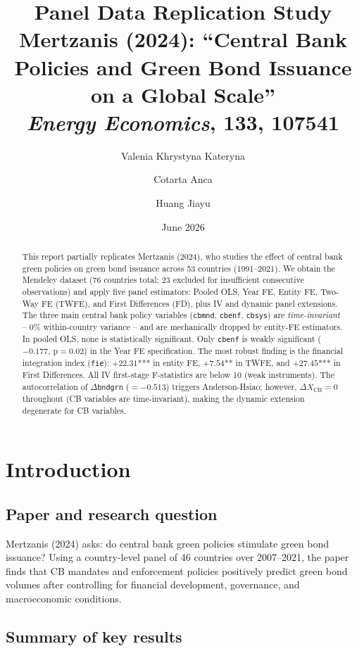 \documentclass[12pt,a4paper]{article}
\title{\textbf{Panel Data Replication Study}\\[0.5em]
\large Mertzanis (2024): ``Central Bank Policies and Green Bond Issuance on a Global Scale''\\
\normalsize \textit{Energy Economics}, 133, 107541}
\author{Valenia Khrystyna Kateryna \and Cotarta Anca \and Huang Jiayu}
\date{June 2026}
\begin{document}
\maketitle
\tableofcontents
\newpage

\begin{abstract}
This report partially replicates Mertzanis (2024), who studies the effect of
central bank green policies on green bond issuance across 53 countries
(1991--2021). We obtain the Mendeley dataset (76 countries total; 23 excluded
for insufficient consecutive observations) and apply five panel estimators:
Pooled OLS, Year FE, Entity FE, Two-Way FE (TWFE), and First Differences (FD),
plus IV and dynamic panel extensions. The three main central bank policy
variables (\texttt{cbmnd}, \texttt{cbenf}, \texttt{cbsys}) are
\emph{time-invariant} -- 0\% within-country variance -- and are mechanically
dropped by entity-FE estimators. In pooled OLS, none is statistically
significant. Only \texttt{cbenf} is weakly significant ($-0.177$, p$=$0.02)
in the Year FE specification. The most robust finding is the financial
integration index (\texttt{fie}): $+22.31$*** in entity FE, $+7.54$** in
TWFE, and $+27.45$*** in First Differences. All IV first-stage F-statistics
are below 10 (weak instruments). The autocorrelation of
$\Delta$\texttt{bndgrn} ($=-0.513$) triggers Anderson-Hsiao; however,
$\Delta X_{\text{CB}}=0$ throughout (CB variables are time-invariant),
making the dynamic extension degenerate for CB variables.
\end{abstract}

\section{Introduction}

\subsection{Paper and research question}

Mertzanis (2024) asks: do central bank green policies stimulate green bond
issuance? Using a country-level panel of 46 countries over 2007--2021, the
paper finds that CB mandates and enforcement policies positively predict green
bond volumes after controlling for financial development, governance, and
macroeconomic conditions.

\subsection{Summary of key results}
\end{document}
